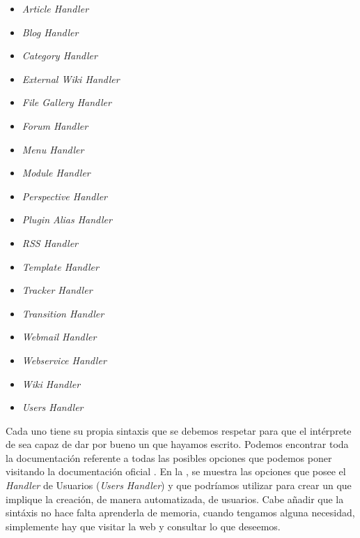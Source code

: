 \begin{itemize}
\item \textit{Article Handler}

\item \textit{Blog Handler}

\item \textit{Category Handler}

\item \textit{External Wiki Handler}

\item \textit{File Gallery Handler}

\item \textit{Forum Handler}

\item \textit{Menu Handler}

\item \textit{Module Handler}

\item \textit{Perspective Handler}

\item \textit{Plugin Alias Handler}

\item \textit{RSS Handler}

\item \textit{Template Handler}

\item \textit{Tracker Handler}

\item \textit{Transition Handler}

\item \textit{Webmail Handler}

\item \textit{Webservice Handler}

\item \textit{Wiki Handler}

\item \textit{Users Handler}
\end{itemize}

Cada uno tiene su propia sintaxis que se debemos respetar para que el intérprete de \profiles{} sea capaz de dar por bueno un \profile{} que hayamos escrito. Podemos encontrar toda la documentación referente a todas las posibles opciones que podemos poner visitando la documentación oficial \cite{web:handlers}. En la , se muestra las opciones que posee el \textit{Handler} de Usuarios (\textit{Users Handler}) y que podríamos utilizar para crear un \profile{} que implique la creación, de manera automatizada, de usuarios. Cabe añadir que la sintáxis no hace falta aprenderla de memoria, cuando tengamos alguna necesidad, simplemente hay que visitar la web y consultar lo que deseemos.

